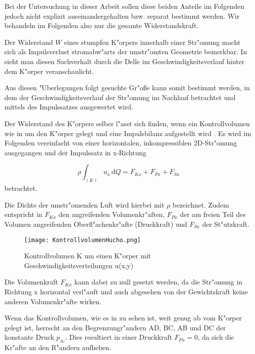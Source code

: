 Bei der Untersuchung in dieser Arbeit sollen diese beiden Anteile im Folgenden jedoch nicht explizit auseinandergehalten bzw. separat bestimmt werden. Wir behandeln im Folgenden also nur die gesamte Widerstandskraft.

Der Widerstand $W$ eines stumpfen K"orpers innerhalb einer Str"omung macht sich als Impulsverlust stromabw"arts der umstr"omten Geometrie bemerkbar.\cite{Hucho.2011} In  sieht man diesen Sachverhalt durch die Delle im Geschwindigkeitsverlauf hinter dem K"orper veranschaulicht. %

Aus diesen "Uberlegungen folgt gesuchte Gr"o\ss{}e kann somit bestimmt werden, in dem der Geschwindigkeitsverlauf der Str"omung im Nachlauf betrachtet und mittels des Impulssatzes ausgewertet wird. 

Der Widerstand des K"orpers selber l"asst sich finden, wenn ein Kontrollvolumen wie in  um den K"orper gelegt und eine Impulsbilanz aufgestellt wird \cite{Hucho.2011}. Es wird im Folgenden vereinfacht von einer horizontalen, inkompressiblen 2D-Str"omung ausgegangen und der Impulssatz in x-Richtung

\begin{equation}
	\label{eq:impulssatz_allg}
	\rho \int_{(K)} u_x \, \mathrm{d}Q = F_{Kx} + F_{Px} + F_{Sx}
\end{equation}
betrachtet.

Die Dichte der umstr"omenden Luft wird hierbei mit $\rho$ bezeichnet.
Zudem entspricht in  $F_{Kx}$ den angreifenden Volumenkr"aften, $F_{Px}$ der am freien Teil des Volumen angreifenden Oberfl"achenkr"afte (Druckkraft) und $F_{Sx}$ der St"utzkraft.

\begin{figure}[h]
	\centering
	\texttt{[image: KontrollvolumenHucho.png]}
	\caption{Kontrollvolumen K um einen K"orper mit Geschwindigkeitsverteilungen u(x,y)~\cite{Hucho.2011}}
	\label{fig:HuchoKV}
\end{figure}

Die Volumenkraft $F_{Kx}$ kann dabei zu null gesetzt werden, da die Str"omung in Richtung x horizontal verl"auft und auch abgesehen von der Gewichtskraft keine anderen Volumenkr"afte wirken.

Wenn das Kontrollvolumen, wie es in  zu sehen ist, weit genug ab vom K"orper gelegt ist, herrscht an den Begrenzungr"andern AD, BC, AB und DC der konstante Druck $p_{\infty}$.
Dies resultiert in einer Druckkraft $F_{Px} = 0$, da sich die Kr"afte an den R"andern aufheben.

